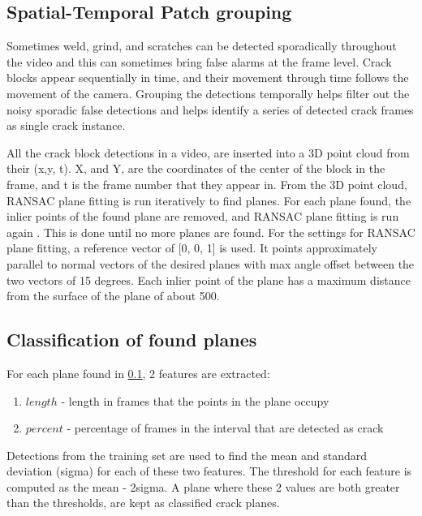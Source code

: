     
    \subsection{Spatial-Temporal Patch grouping}
    \label{grouping}
                Sometimes weld, grind, and scratches can be detected sporadically throughout the video and this can sometimes bring false alarms at the frame level. Crack blocks appear sequentially in time, and their movement through time follows the movement of the camera.  Grouping the detections temporally helps filter out the noisy sporadic false detections and helps identify a series of detected crack frames as single crack instance.
                
                All the crack block detections in a video, are inserted into a 3D point cloud from their (x,y, t). X, and Y, are the coordinates of the center of the block in the frame, and t is the frame number that they appear in.   From the 3D point cloud, RANSAC plane fitting is run iteratively to  find planes.  For each plane found, the inlier points of the found plane are removed, and RANSAC plane fitting is run again . This is done until no more planes are found.  For the settings for RANSAC plane fitting, a reference vector of [0, 0, 1] is used. It points approximately parallel to normal vectors of the desired planes with max angle offset between the two vectors of 15 degrees. Each inlier point of the plane has a maximum distance from the surface of the plane of about 500.  
    
    
    \subsection{Classification of found planes}
            For each plane found in \ref{grouping}, 2 features are extracted:
            \begin{enumerate}
                \item  $length$ - length in frames that the points in the plane occupy
                \item $percent$ - percentage of frames in the interval that are detected as crack
            \end{enumerate}
            Detections from the training set are used to find the mean and standard deviation (sigma) for each of these two features.  The threshold for each feature is computed as the  mean - 2sigma. A plane  where these 2 values are both greater than the thresholds, are kept as classified crack planes.  
         

